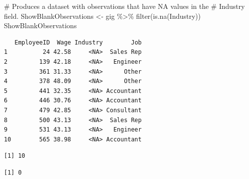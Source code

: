 \documentclass[
  letterpaper,
  DIV=11,
  numbers=noendperiod]{scrreprt}
\newenvironment{Shaded}{\begin{snugshade}}{\end{snugshade}}
\newcommand{\CommentTok}[1]{\textcolor[rgb]{0.37,0.37,0.37}{#1}}
\newcommand{\FunctionTok}[1]{\textcolor[rgb]{0.28,0.35,0.67}{#1}}
\newcommand{\NormalTok}[1]{\textcolor[rgb]{0.00,0.23,0.31}{#1}}
\newcommand{\OtherTok}[1]{\textcolor[rgb]{0.00,0.23,0.31}{#1}}
\newcommand{\SpecialCharTok}[1]{\textcolor[rgb]{0.37,0.37,0.37}{#1}}
\begin{document}
\begin{Shaded}
\begin{Highlighting}[]
\CommentTok{\# Produces a dataset with observations that have NA values in the}
\CommentTok{\# Industry field.}
\NormalTok{ShowBlankObservations }\OtherTok{\textless{}{-}}\NormalTok{ gig }\SpecialCharTok{\%\textgreater{}\%}
    \FunctionTok{filter}\NormalTok{(}\FunctionTok{is.na}\NormalTok{(Industry))}
\NormalTok{ShowBlankObservations}
\end{Highlighting}
\end{Shaded}

\begin{verbatim}
   EmployeeID  Wage Industry        Job
1          24 42.58     <NA>  Sales Rep
2         139 42.18     <NA>   Engineer
3         361 31.33     <NA>      Other
4         378 48.09     <NA>      Other
5         441 32.35     <NA> Accountant
6         446 30.76     <NA> Accountant
7         479 42.85     <NA> Consultant
8         500 43.13     <NA>  Sales Rep
9         531 43.13     <NA>   Engineer
10        565 38.98     <NA> Accountant
\end{verbatim}

\begin{Shaded}
\end{Shaded}

\begin{verbatim}
[1] 10
\end{verbatim}

\begin{Shaded}
\end{Shaded}

\begin{verbatim}
[1] 0
\end{verbatim}
\end{document}
